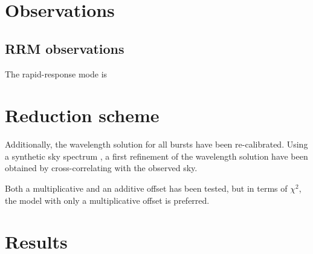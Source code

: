 \documentclass[iop, twocolappendix, numberedappendix, tighten, appendixfloats]{emulateapj}
\begin{document}
	\cleardoublepage

	
	\section{Observations}


	
	\subsection{RRM observations} \label{RRM}
	The rapid-response mode is 
	
	\section{Reduction scheme}

	Additionally, the wavelength solution for all bursts have been re-calibrated. Using a synthetic sky spectrum \citep{Noll2012, Jones2013}, a first refinement of the wavelength solution have been obtained by cross-correlating with the observed sky. 
	
	
	Both a multiplicative and an additive offset has been tested, but in terms of $\chi^2$, the model with only a multiplicative offset is preferred. 
	
	
	\section{Results}
		
\end{document}
